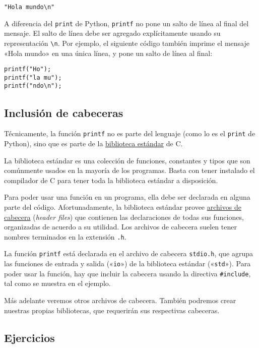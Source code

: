 \begin{lstlisting}
"Hola mundo\n"
\end{lstlisting}

A diferencia del \lstinline!print! de Python, \lstinline!printf! no pone
un salto de línea al final del mensaje. El salto de línea debe ser
agregado explícitamente usando su representación \lstinline!\n!. Por
ejemplo, el siguiente código también imprime el mensaje «Hola mundo» en
una única línea, y pone un salto de línea al final:

\begin{lstlisting}
printf("Ho");
printf("la mu");
printf("ndo\n");
\end{lstlisting}

\subsection{Inclusión de cabeceras}

Técnicamente, la función \lstinline!printf! no es parte del lenguaje
(como lo es el \lstinline!print! de Python), sino que es parte de la
\href{http://es.wikipedia.org/wiki/Biblioteca\_est\%C3\%A1ndar\_de\_C}{biblioteca
estándar} de C.

La biblioteca estándar es una colección de funciones, constantes y tipos
que son comúnmente usados en la mayoría de los programas. Basta con
tener instalado el compilador de C para tener toda la biblioteca
estándar a disposición.

Para poder usar una función en un programa, ella debe ser declarada en
alguna parte del código. Afortunadamente, la biblioteca estándar provee
\href{http://es.wikipedia.org/wiki/Archivo\_de\_cabecera}{archivos de
cabecera} (\emph{header files}) que contienen las declaraciones de todas
sus funciones, organizadas de acuerdo a su utilidad. Los archivos de
cabecera suelen tener nombres terminados en la extensión \lstinline!.h!.

La función \lstinline!printf! está declarada en el archivo de cabecera
\lstinline!stdio.h!, que agrupa las funciones de entrada y salida
(«\lstinline!io!») de la biblioteca estándar («\lstinline!std!»). Para
poder usar la función, hay que incluir la cabecera usando la directiva
\lstinline!#include!, tal como se muestra en el ejemplo.

Más adelante veremos otros archivos de cabecera. También podremos crear
nuestras propias bibliotecas, que requerirán sus respectivas cabeceras.

\subsection{Ejercicios}

